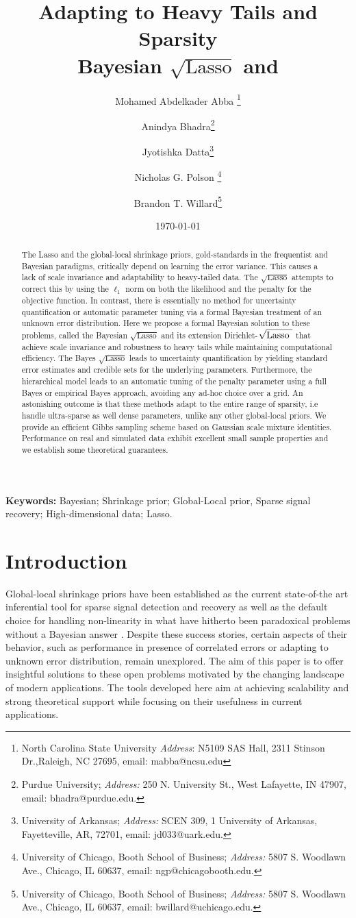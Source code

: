 \documentclass[10pt]{article}
\title{Adapting to Heavy Tails and Sparsity \\
Bayesian $\sqrt{\text{Lasso}}$ and \sqdl{}}
\author{
  Mohamed Abdelkader Abba \footnote{North Carolina State University {\em Address}: N5109 SAS Hall, 2311 Stinson Dr.,Raleigh, NC 27695, email: mabba@ncsu.edu}
	\and
  Anindya Bhadra\footnote{Purdue University; 
  {\em Address:} 250 N. University St., West Lafayette, IN 47907, 
  email: bhadra@purdue.edu.}
  \and Jyotishka Datta\footnote{
	University of Arkansas; {\em Address:} SCEN 309, 1 University of Arkansas, Fayetteville, AR, 72701, 
  email: jd033@uark.edu.}  
  \and Nicholas G. Polson \footnote{
	University of Chicago, Booth School of Business; 
  {\em Address:} 5807 S. Woodlawn Ave., Chicago, IL 60637, 
  email: ngp@chicagobooth.edu.}
    \and 
  Brandon T. Willard\footnote{
	University of Chicago, Booth School of Business; 
  {\em Address:} 5807 S. Woodlawn Ave., Chicago, IL 60637, 
  email: bwillard@uchicago.edu.}
}
\date{\today}
\def\sql{$\sqrt{\text{Lasso}}$}
\def\sqdl{Dirichlet-$\sqrt{\text{\rm{Lasso} }}$}
\begin{document}
\maketitle

\begin{abstract}
\noindent 
The Lasso and the global-local shrinkage priors, gold-standards in the frequentist and Bayesian paradigms, critically depend on learning the error variance. This causes a lack of scale invariance and adaptability to heavy-tailed data. The \sql{} \citep{belloni2011square} attempts to correct this by using the $\ell_1$ norm on both the likelihood and the penalty for the objective function. In contrast, there is essentially no method for uncertainty quantification or automatic parameter tuning via a formal Bayesian treatment of an unknown error distribution. Here we propose a formal Bayesian solution to these problems, called the Bayesian \sql{} and its extension \sqdl{} that achieve scale invariance and robustness to heavy tails while maintaining computational efficiency. The Bayes \sql{} leads to uncertainty quantification by yielding standard error estimates and credible sets for the underlying parameters. Furthermore, the hierarchical model leads to an automatic tuning of the penalty parameter using a full Bayes or empirical Bayes approach, avoiding any ad-hoc choice over a grid. An astonishing outcome is that these methods adapt to the entire range of sparsity, i.e handle ultra-sparse as well dense parameters, unlike any other global-local priors. We provide an efficient Gibbs sampling scheme based on Gaussian scale mixture identities. Performance on real and simulated data exhibit excellent small sample properties and we establish some theoretical guarantees. 
\end{abstract}

\noindent \textbf{Keywords:}
Bayesian; Shrinkage prior; Global-Local prior, Sparse signal recovery; High-dimensional data; Lasso. 


\section{Introduction}

Global-local shrinkage priors have been established as the current state-of-the art inferential tool for sparse signal detection and recovery as well as the default choice for handling non-linearity in what have hitherto been paradoxical problems without a Bayesian answer \citep{polson2010shrink, van2017adaptive, bhadra2017horseshoe}. Despite these success stories, certain aspects of their behavior, such as performance in presence of correlated errors or adapting to unknown error distribution, remain unexplored. The aim of this paper is to offer insightful solutions to these open problems motivated by the changing landscape of modern applications. The tools developed here aim at achieving scalability and strong theoretical support while focusing on their usefulness in current applications. 
\end{document}
